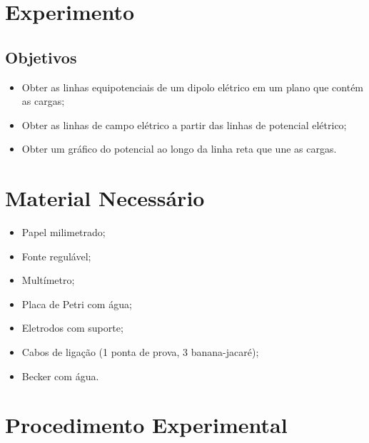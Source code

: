 \section{Experimento}

\subsection{Objetivos}

\begin{itemize}
	\item Obter as linhas equipotenciais de um dipolo elétrico em um plano que contém as cargas;
	\item Obter as linhas de campo elétrico a partir das linhas de potencial elétrico;
	\item Obter um gráfico do potencial ao longo da linha reta que une as cargas.
\end{itemize}

\section{Material Necessário}

\begin{itemize}
	\item Papel milimetrado;
	\item Fonte regulável;
	\item Multímetro;
	\item Placa de Petri com água;
	\item Eletrodos com suporte;
	\item Cabos de ligação (1 ponta de prova, 3 banana-jacaré);
	\item Becker com água.
\end{itemize}

\section{Procedimento Experimental}

